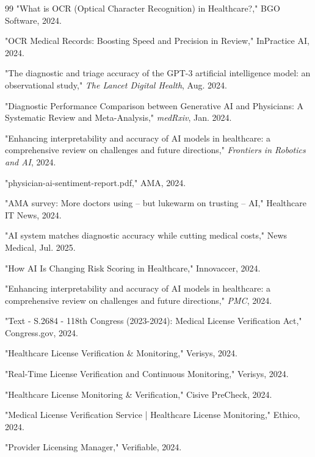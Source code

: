 \documentclass[conference]{IEEEtran}
\begin{document}
\begin{thebibliography}{99}
"What is OCR (Optical Character Recognition) in Healthcare?," BGO Software, 2024.

"OCR Medical Records: Boosting Speed and Precision in Review," InPractice AI, 2024.

"The diagnostic and triage accuracy of the GPT-3 artificial intelligence model: an observational study," \textit{The Lancet Digital Health}, Aug. 2024.

"Diagnostic Performance Comparison between Generative AI and Physicians: A Systematic Review and Meta-Analysis," \textit{medRxiv}, Jan. 2024.

"Enhancing interpretability and accuracy of AI models in healthcare: a comprehensive review on challenges and future directions," \textit{Frontiers in Robotics and AI}, 2024.

"physician-ai-sentiment-report.pdf," AMA, 2024.

"AMA survey: More doctors using – but lukewarm on trusting – AI," Healthcare IT News, 2024.

"AI system matches diagnostic accuracy while cutting medical costs," News Medical, Jul. 2025.

"How AI Is Changing Risk Scoring in Healthcare," Innovaccer, 2024.

"Enhancing interpretability and accuracy of AI models in healthcare: a comprehensive review on challenges and future directions," \textit{PMC}, 2024.

"Text - S.2684 - 118th Congress (2023-2024): Medical License Verification Act," Congress.gov, 2024.

"Healthcare License Verification \& Monitoring," Verisys, 2024.

"Real-Time License Verification and Continuous Monitoring," Verisys, 2024.

"Healthcare License Monitoring \& Verification," Cisive PreCheck, 2024.

"Medical License Verification Service | Healthcare License Monitoring," Ethico, 2024.

"Provider Licensing Manager," Verifiable, 2024.


\end{thebibliography}
\end{document}
